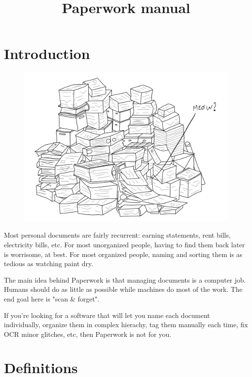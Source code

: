\documentclass[10pt,a4paper]{article}
\date{}
\title{Paperwork manual}
\begin{document}
\maketitle

\pagebreak

\tableofcontents

\pagebreak

\section{Introduction}

\begin{figure}[H]
	\includegraphics{data/user_manual_intro.png}
\end{figure}

Most personal documents are fairly recurrent: earning statements, rent bills,
electricity bills, etc. For most unorganized people, having to find them back
later is worrisome, at best. For most organized people, naming and sorting them
is as tedious as watching paint dry.

The main idea behind Paperwork is that managing documents is a computer job.
Humans should do as little as possible while machines do most of the work.
The end goal here is "scan \& forget".

If you're looking for a software that will let you name each document
individually, organize them in complex hierachy, tag them manually each time,
fix OCR minor glitches, etc, then Paperwork is not for you.


\section{Definitions}
\end{document}
